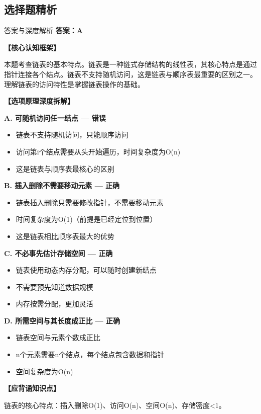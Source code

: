 \documentclass[12pt, a4paper]{article}
\newenvironment{bluebox}{\begin{framed}\begin{minipage}{\linewidth}}{\end{minipage}\end{framed}}
\begin{document}
\subsection{选择题精析}

\begin{bluebox}{答案与深度解析}
	\textbf{答案：A}

	\textbf{【核心认知框架】}

	本题考查链表的基本特点。链表是一种链式存储结构的线性表，其核心特点是通过指针连接各个结点。链表不支持随机访问，这是链表与顺序表最重要的区别之一。理解链表的访问特性是掌握链表操作的基础。

	\textbf{【选项原理深度拆解】}

	\item \textbf{A. 可随机访问任一结点 — 错误}
	\begin{itemize}
		\item 链表不支持随机访问，只能顺序访问
		\item 访问第i个结点需要从头开始遍历，时间复杂度为O(n)
		\item 这是链表与顺序表最核心的区别
	\end{itemize}

	\item \textbf{B. 插入删除不需要移动元素 — 正确}
	\begin{itemize}
		\item 链表插入删除只需要修改指针，不需要移动元素
		\item 时间复杂度为O(1)（前提是已经定位到位置）
		\item 这是链表相比顺序表最大的优势
	\end{itemize}

	\item \textbf{C. 不必事先估计存储空间 — 正确}
	\begin{itemize}
		\item 链表使用动态内存分配，可以随时创建新结点
		\item 不需要预先知道数据规模
		\item 内存按需分配，更加灵活
	\end{itemize}

	\item \textbf{D. 所需空间与其长度成正比 — 正确}
	\begin{itemize}
		\item 链表空间与元素个数成正比
		\item n个元素需要n个结点，每个结点包含数据和指针
		\item 空间复杂度为O(n)
	\end{itemize}

	\textbf{【应背诵知识点】}

	链表的核心特点：插入删除O(1)、访问O(n)、空间O(n)、存储密度<1。
\end{bluebox}
\end{document}

